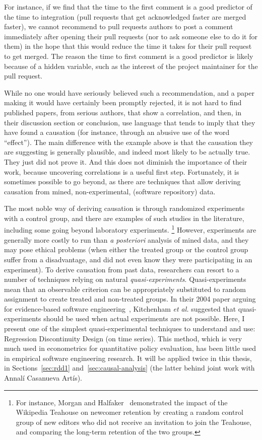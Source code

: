 For instance, if we find that the time to the first comment is a good predictor of the time to integration (pull requests that get acknowledged faster are merged faster), we cannot recommend to pull requests authors to post a comment immediately after opening their pull requests (nor to ask someone else to do it for them) in the hope that this would reduce the time it takes for their pull request to get merged.
The reason the time to first comment is a good predictor is likely because of a hidden variable, such as the interest of the project maintainer for the pull request.

While no one would have seriously believed such a recommendation, and a paper making it would have certainly been promptly rejected, it is not hard to find published papers, from serious authors, that show a correlation, and then, in their discussion section or conclusion, use language that tends to imply that they have found a causation (for instance, through an abusive use of the word ``effect'').
The main difference with the example above is that the causation they are suggesting is generally plausible, and indeed most likely to be actually true.
They just did not prove it.
And this does not diminish the importance of their work, because uncovering correlations is a useful first step.
Fortunately, it is sometimes possible to go beyond, as there are techniques that allow deriving causation from mined, non-experimental, (software repository) data.

The most noble way of deriving causation is through randomized experiments with a control group, and there are examples of such studies in the literature, including some going beyond laboratory experiments.%
\footnote{
	For instance, Morgan and Halfaker~\cite{morgan2018evaluating} demonstrated the impact of the Wikipedia Teahouse on newcomer retention by creating a random control group of new editors who did not receive an invitation to join the Teahouse, and comparing the long-term retention of the two groups.
}
However, experiments are generally more costly to run than \emph{a posteriori} analysis of mined data, and they may pose ethical problems (when either the treated group or the control group suffer from a disadvantage, and did not even know they were participating in an experiment).
To derive causation from past data, researchers can resort to a number of techniques relying on natural \emph{quasi-experiments}.
Quasi-experiments mean that an observable criterion can be appropriately substituted to random assignment to create treated and non-treated groups.
In their 2004 paper arguing for evidence-based software engineering~\cite{kitchenham2004evidence}, Kitchenham \emph{et al.} suggested that quasi-experiments should be used when actual experiments are not possible.
Here, I present one of the simplest quasi-experimental techniques to understand and use: Regression Discontinuity Design (on time series).
This method, which is very much used in econometrics for quantitative policy evaluation, has been little used in empirical software engineering research.
It will be applied twice in this thesis, in Sections~\ref{sec:rdd1} and~\ref{sec:causal-analysis} (the latter behind joint work with Annal\'i Casanueva Art\'is).

